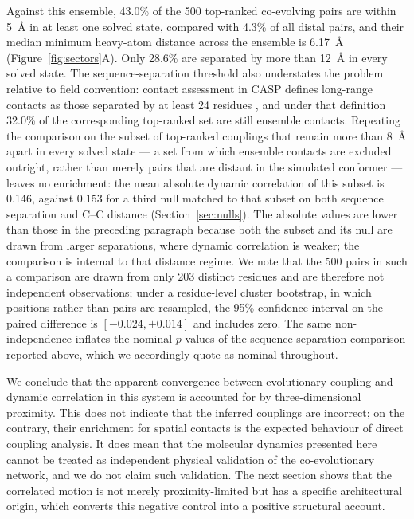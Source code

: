\documentclass[utf8]{FrontiersinHarvard}
\begin{document}
Against this ensemble, 43.0\% of the 500 top-ranked co-evolving pairs are within 5~\AA{} in at least one solved state, compared with 4.3\% of all distal pairs, and their median minimum heavy-atom distance across the ensemble is 6.17~\AA{} (Figure~\ref{fig:sectors}A). Only 28.6\% are separated by more than 12~\AA{} in every solved state. The sequence-separation threshold also understates the problem relative to field convention: contact assessment in CASP defines long-range contacts as those separated by at least 24 residues \citep{Monastyrskyy2014}, and under that definition 32.0\% of the corresponding top-ranked set are still ensemble contacts. Repeating the comparison on the subset of top-ranked couplings that remain more than 8~\AA{} apart in every solved state --- a set from which ensemble contacts are excluded outright, rather than merely pairs that are distant in the simulated conformer --- leaves no enrichment: the mean absolute dynamic correlation of this subset is 0.146, against 0.153 for a third null matched to that subset on both sequence separation and C\textalpha{}--C\textalpha{} distance (Section~\ref{sec:nulls}). The absolute values are lower than those in the preceding paragraph because both the subset and its null are drawn from larger separations, where dynamic correlation is weaker; the comparison is internal to that distance regime. We note that the 500 pairs in such a comparison are drawn from only 203 distinct residues and are therefore not independent observations; under a residue-level cluster bootstrap, in which positions rather than pairs are resampled, the 95\% confidence interval on the paired difference is $[-0.024, +0.014]$ and includes zero. The same non-independence inflates the nominal $p$-values of the sequence-separation comparison reported above, which we accordingly quote as nominal throughout.

We conclude that the apparent convergence between evolutionary coupling and dynamic correlation in this system is accounted for by three-dimensional proximity. This does not indicate that the inferred couplings are incorrect; on the contrary, their enrichment for spatial contacts is the expected behaviour of direct coupling analysis. It does mean that the molecular dynamics presented here cannot be treated as independent physical validation of the co-evolutionary network, and we do not claim such validation. The next section shows that the correlated motion is not merely proximity-limited but has a specific architectural origin, which converts this negative control into a positive structural account.
\end{document}
